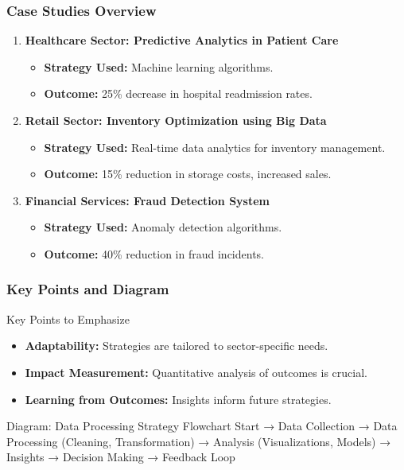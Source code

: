 \documentclass[aspectratio=169]{beamer}
\begin{document}
\begin{frame}[fragile]
    \frametitle{Case Studies Overview}
    \begin{enumerate}
        \item \textbf{Healthcare Sector: Predictive Analytics in Patient Care}
            \begin{itemize}
                \item \textbf{Strategy Used:} Machine learning algorithms.
                \item \textbf{Outcome:} 25\% decrease in hospital readmission rates.
            \end{itemize}
        
        \item \textbf{Retail Sector: Inventory Optimization using Big Data}
            \begin{itemize}
                \item \textbf{Strategy Used:} Real-time data analytics for inventory management.
                \item \textbf{Outcome:} 15\% reduction in storage costs, increased sales.
            \end{itemize}
        
        \item \textbf{Financial Services: Fraud Detection System}
            \begin{itemize}
                \item \textbf{Strategy Used:} Anomaly detection algorithms.
                \item \textbf{Outcome:} 40\% reduction in fraud incidents.
            \end{itemize}
    \end{enumerate}
\end{frame}

\begin{frame}[fragile]
    \frametitle{Key Points and Diagram}
    \begin{block}{Key Points to Emphasize}
        \begin{itemize}
            \item \textbf{Adaptability:} Strategies are tailored to sector-specific needs.
            \item \textbf{Impact Measurement:} Quantitative analysis of outcomes is crucial.
            \item \textbf{Learning from Outcomes:} Insights inform future strategies.
        \end{itemize}
    \end{block}

    \begin{block}{Diagram: Data Processing Strategy Flowchart}
        Start → Data Collection → Data Processing (Cleaning, Transformation) → Analysis (Visualizations, Models) → Insights → Decision Making → Feedback Loop
    \end{block}
\end{frame}
\end{document}
